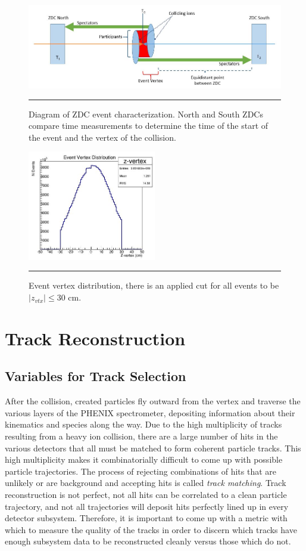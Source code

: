 \begin{figure}[htbp!]
  \centering
    \includegraphics[width=1\textwidth]{Figures/BBCevtchar.JPG}
    \rule{35em}{0.5pt}
  \caption[Diagram of ZDC event characterization]{Diagram of ZDC event characterization. North and South ZDCs compare time measurements to determine the time of the start of the event and the vertex of the collision.}
  \label{fig:zdcvtx}
\end{figure}


\begin{figure}[htbp!]
  \centering
    \includegraphics[width=0.5\textwidth]{evtQA/zvtxdist.JPG}
    \rule{35em}{0.5pt}
  \caption[Event Vertex Distribution]{Event vertex distribution, there is an applied cut for all events to be $|z_{vtx}| \leq 30$ cm.}
  \label{fig:vtxdist}
\end{figure}

\section{Track Reconstruction}
\label{trkrecosect}
\subsection{Variables for Track Selection}
After the collision, created particles fly outward from the vertex and traverse the various layers of the PHENIX spectrometer, depositing information about their kinematics and species along the way. Due to the high multiplicity of tracks resulting from a heavy ion collision, there are a large number of hits in the various detectors that all must be matched to form coherent particle tracks. This high multiplicity makes it combinatorially difficult to come up with possible particle trajectories. The process of rejecting combinations of hits that are unlikely or are background and accepting hits is called \textit{track matching}. Track reconstruction is not perfect, not all hits can be correlated to a clean particle trajectory, and not all trajectories will deposit hits perfectly lined up in every detector subsystem. Therefore, it is important to come up with a metric with which to measure the quality of the tracks in order to discern which tracks have enough subsystem data to be reconstructed cleanly versus those which do not.

